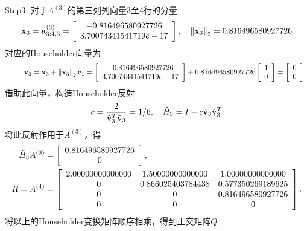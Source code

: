 \documentclass[UTF8]{ctexart}
\begin{document}
Step3: 对于$A^{(3)}$的第三列列向量3至4行的分量
\begin{align}
\mathbf{x}_{3}=\mathbf{a}_{3: 4,3}^{(3)}=\left[\begin{array}{c}
-0.816496580927726 \\
3.70074341541719e-17
\end{array}\right], \quad\left\|\mathbf{x}_{3}\right\|_{2}=0.816496580927726 \notag
\end{align}
对应的Householder向量为
\begin{align}
\begin{array}{l}
\qquad \tilde{\mathbf{v}}_{3}=\mathbf{x}_{3}+\left\|\mathbf{x}_{3}\right\|_{2} \mathbf{e}_{1}=\left[\begin{array}{c}
-0.816496580927726 \\
3.70074341541719e-17
\end{array}\right]+0.816496580927726\left[\begin{array}{r}
1 \\
0 
\end{array}\right]=\left[\begin{array}{c}
0 \\
0
\end{array}\right]
\end{array} \notag
\end{align}
借助此向量，构造Householder反射
\begin{align}
c=\frac{2}{\tilde{\mathbf{v}}_{3}^{T} \tilde{\mathbf{v}}_{3}}=1/6, \quad \tilde{H}_{3}=I-c \tilde{\mathbf{v}}_{3} \tilde{\mathbf{v}}_{3}^{T} \notag
\end{align}
将此反射作用于$A^{(3)}$，得
\begin{align}
\begin{aligned}
\tilde{H}_{3} A^{(3)} &= 
\left[\begin{array}{c}
0.816496580927726 \\
0
\end{array}\right],\\
R = A^{(4)} &=  
\left[\begin{array}{ccc}
2.00000000000000 &	1.50000000000000 &	1.00000000000000 \\
0 &	0.866025403784438 &	0.577350269189625 \\
0 &	0 &	0.816496580927726 \\
0 &	0 &	0
\end{array}\right].\notag
\end{aligned}
\end{align}
将以上的Householder变换矩阵顺序相乘，得到正交矩阵$Q$
\end{document}
